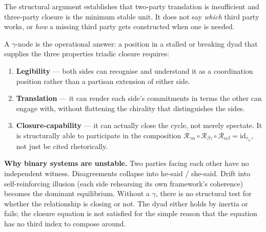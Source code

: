 \documentclass[
]{article}
\providecommand{\tightlist}{%
  \setlength{\itemsep}{0pt}\setlength{\parskip}{0pt}}
\begin{document}
The structural argument establishes that two-party translation is
insufficient and three-party closure is the minimum stable unit. It
does not say \emph{which} third party works, or \emph{how} a missing
third party gets constructed when one is needed.

A \(\gamma\)-node is the operational answer: a position in a stalled or
breaking dyad that supplies the three properties triadic closure
requires:

\begin{enumerate}
\def\labelenumi{(\arabic{enumi})}
\tightlist
\item
  \textbf{Legibility} --- both sides can recognise and understand it as
  a coordination position rather than a partisan extension of either
  side.
\item
  \textbf{Translation} --- it can render each side's commitments in
  terms the other can engage with, without flattening the chirality
  that distinguishes the sides.
\item
  \textbf{Closure-capability} --- it can actually close the cycle, not
  merely spectate. It is structurally able to participate in the
  composition \(\mathcal{R}_{\gamma\alpha} \circ \mathcal{R}_{\beta\gamma} \circ \mathcal{R}_{\alpha\beta} = \mathrm{id}_{\tau_\alpha}\),
  not just be cited rhetorically.
\end{enumerate}

\begin{center}
\end{center}

\textbf{Why binary systems are unstable.} Two parties facing each other
have no independent witness. Disagreements collapse into he-said /
she-said. Drift into self-reinforcing illusion (each side rehearsing
its own framework's coherence) becomes the dominant equilibrium.
Without a \(\gamma\), there is no structural test for whether the
relationship is closing or not. The dyad either holds by inertia or
fails; the closure equation is not satisfied for the simple reason
that the equation has no third index to compose around.
\end{document}

